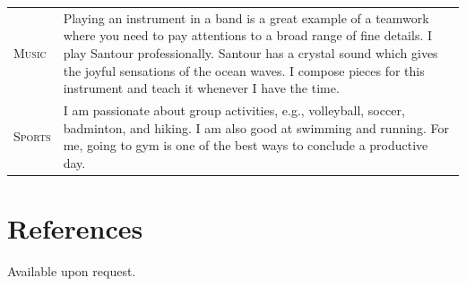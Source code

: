 \documentclass[10PT,letter]{article}
\newcommand{\numbox}[1]{} %
\begin{document}
	\begin{tabular}{p{1.2in}p{5.55in}}
		\textsc{Music} & Playing an instrument in a band is a great example of a teamwork where you need to pay attentions to a broad range of fine details.   I play Santour professionally. Santour has a crystal sound which gives the joyful sensations of  the ocean waves.  I compose pieces for this instrument and teach it whenever I have the time. \\[.5mm]
		\textsc{Sports} & I am passionate about group activities, e.g., volleyball, soccer, badminton, and hiking. I am also good at swimming and running. For me, going to gym is one of the best ways to conclude a productive day. \\[.5mm]
	\end{tabular}
\section*{\numbox{9}\bfseries\textcolor{titlecol}{\sffamily References}}

Available upon request. 

\end{document}
